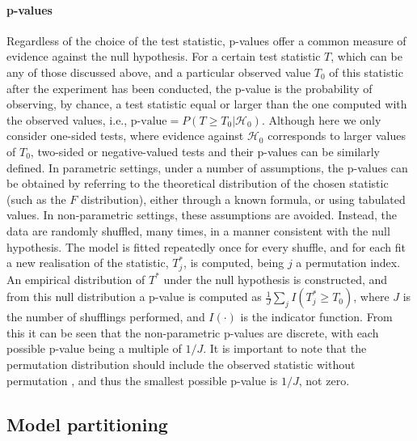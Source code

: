 \paragraph{p-values} Regardless of the choice of the test statistic, p-values offer a common measure of evidence against the null hypothesis. For a certain test statistic $T$, which can be any of those discussed above, and a particular observed value $T_{0}$ of this statistic after the experiment has been conducted, the p-value is the probability of observing, by chance, a test statistic equal or larger than the one computed with the observed values, i.e., $\text{p-value}=P(T \geqslant T_{0} | \mathcal{H}_{0})$. Although here we only consider one-sided tests, where evidence against $\mathcal{H}_{0}$ corresponds to larger values of $T_{0}$, two-sided or negative-valued tests and their p-values can be similarly defined. In parametric settings, under a number of assumptions, the p-values can be obtained by referring to the theoretical distribution of the chosen statistic (such as the $F$ distribution), either through a known formula, or using tabulated values. In non-parametric settings, these assumptions are avoided. Instead, the data are randomly shuffled, many times, in a manner consistent with the null hypothesis. The model is fitted repeatedly once for every shuffle, and for each fit a new realisation of the statistic, $T_{j}^{*}$, is computed, being $j$ a permutation index. An empirical distribution of $T^{*}$ under the null hypothesis is constructed, and from this null distribution a p-value is computed as $\frac{1}{J}\sum_{j}I(T^{*}_j \geqslant T_{0})$, where $J$ is the number of shufflings performed, and $I(\cdot)$ is the indicator function. From this it can be seen that the non-parametric p-values are discrete, with each possible p-value being a multiple of $1/J$. It is important to note that the permutation distribution should include the observed statistic without permutation \citep{Edgington1969, Phipson2010}, and thus the smallest possible p-value is $1/J$, not zero.

\subsection{Model partitioning}
\label{sec:perm:partitioning}

